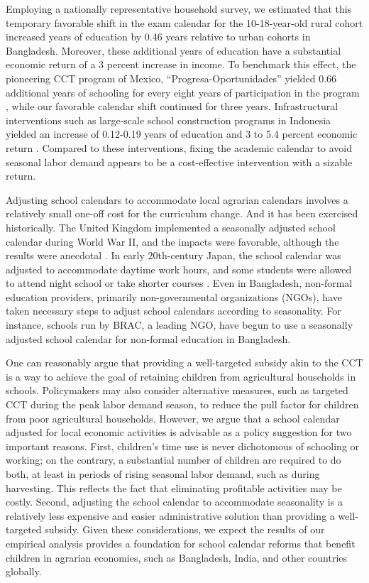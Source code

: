 \documentclass[12pt,letterpaper]{article}
\newcommand{\0}{\ensuremath{\mbox{\boldmath $0$}}}
\begin{document}
Employing a nationally representative household survey, we estimated that this temporary favorable shift in the exam calendar for the 10-18-year-old rural cohort increased years of education by 0.46 years relative to urban cohorts in Bangladesh. Moreover, these additional years of education have a substantial economic return of a 3 percent increase in income. To benchmark this effect, the pioneering CCT program of Mexico, ``Progresa-Oportunidades'' yielded 0.66 additional years of schooling for every eight years of participation in the program \citep{reimers2006education}, while our favorable calendar shift continued for three years. Infrastructural interventions such as large-scale school construction programs in Indonesia yielded an increase of 0.12-0.19 years of education and 3 to 5.4 percent economic return \citep{duflo2001schooling}. Compared to these interventions, fixing the academic calendar to avoid seasonal labor demand appears to be a cost-effective intervention with a sizable return.

Adjusting school calendars to accommodate local agrarian calendars involves a relatively small one-off cost for the curriculum change. And it has been exercised historically. The United Kingdom implemented a seasonally adjusted school calendar during World War II, and the impacts were favorable, although the results were anecdotal \citep[][190-191]{Moore2004}. In early 20th-century Japan, the school calendar was adjusted to accommodate daytime work hours, and some students were allowed to attend night school or take shorter courses \citep[][Chapter 3]{JICA2004}. Even in Bangladesh, non-formal education providers, primarily non-governmental organizations (NGOs), have taken necessary steps to adjust school calendars according to seasonality. For instance, schools run by BRAC, a leading NGO, have begun to use a seasonally adjusted school calendar for non-formal education in Bangladesh.

One can reasonably argue that providing a well-targeted subsidy akin to the CCT is a way to achieve the goal of retaining children from agricultural households in schools. Policymakers may also consider alternative measures, such as targeted CCT during the peak labor demand season, to reduce the pull factor for children from poor agricultural households. However, we argue that a school calendar adjusted for local economic activities is advisable as a policy suggestion for two important reasons. First, children's time use is never dichotomous of schooling or working; on the contrary, a substantial number of children are required to do both, at least in periods of rising seasonal labor demand, such as during harvesting. This reflects the fact that eliminating profitable activities may be costly. Second, adjusting the school calendar to accommodate seasonality is a relatively less expensive and easier administrative solution than providing a well-targeted subsidy. Given these considerations, we expect the results of our empirical analysis provides a foundation for school calendar reforms that benefit children in agrarian economies, such as Bangladesh, India, and other countries globally.
\end{document}
